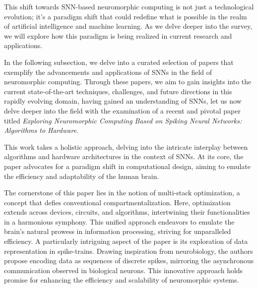 \documentclass[screen, acmtog]{acmart}
\begin{document}
This shift towards SNN-based neuromorphic computing is not just a technological evolution; it’s a paradigm shift that could redefine what is possible in the realm of artificial intelligence and machine learning. As we delve deeper into the survey, we will explore how this paradigm is being realized in current research and applications.

In the following subsection, we delve into a curated selection of papers that exemplify the advancements and applications of SNNs in the field of neuromorphic computing. Through these papers, we aim to gain insights into the current state-of-the-art techniques, challenges, and future directions in this rapidly evolving domain, having gained an understanding of SNNs, let us now delve deeper into the field with the examination of a recent and pivotal paper titled \textit{Exploring Neuromorphic Computing Based on Spiking Neural Networks: Algorithms to Hardware}.


This work\cite{Spiking} takes a holistic approach, delving into the intricate interplay between algorithms and hardware architectures in the context of SNNs. At its core, the paper advocates for a paradigm shift in computational design, aiming to emulate the efficiency and adaptability of the human brain.

The cornerstone of this paper lies in the notion of multi-stack optimization, a concept that defies conventional compartmentalization. Here, optimization extends across devices, circuits, and algorithms, intertwining their functionalities in a harmonious symphony. This unified approach endeavors to emulate the brain's natural prowess in information processing, striving for unparalleled efficiency. A particularly intriguing aspect of the paper is its exploration of data representation in spike-trains. Drawing inspiration from neurobiology, the authors propose encoding data as sequences of discrete spikes, mirroring the asynchronous communication observed in biological neurons. This innovative approach holds promise for enhancing the efficiency and scalability of neuromorphic systems.
\end{document}
